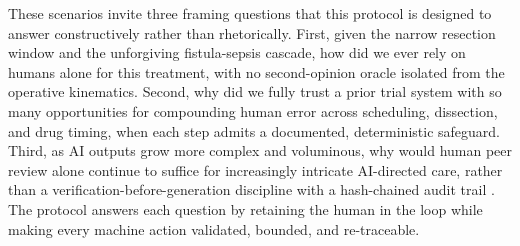 These scenarios invite three framing questions that this protocol is designed to
answer constructively rather than rhetorically. First, given the narrow resection
window and the unforgiving fistula-sepsis cascade, how did we ever rely on humans
alone for this treatment, with no second-opinion oracle isolated from the
operative kinematics. Second, why did we fully trust a prior trial system with so
many opportunities for compounding human error across scheduling, dissection, and
drug timing, when each step admits a documented, deterministic safeguard. Third,
as AI outputs grow more complex and voluminous, why would human peer review alone
continue to suffice for increasingly intricate AI-directed care, rather than a
verification-before-generation discipline with a hash-chained audit trail
\cite{kawchak2026hr9510}. The protocol answers each question by retaining the
human in the loop while making every machine action validated, bounded, and
re-traceable.

